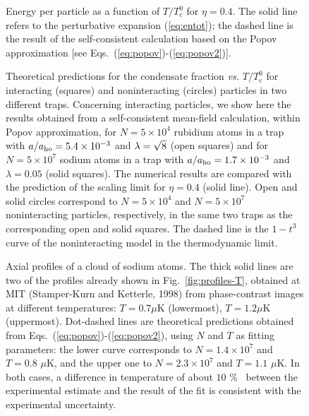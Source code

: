 \bigskip

\begin{figure}[t]
\epsfysize=8cm
\hspace{3cm}
\caption{ Energy per particle as a function of $T/T_c^0$ for $\eta=0.4$. 
The solid line refers to the perturbative expansion (\protect\ref{eq:entot}); 
the dashed line is the result of the self-consistent calculation based on 
the Popov approximation 
[see Eqs.~(\protect\ref{eq:popov})-(\protect\ref{eq:popov2})].} 
\label{fig:s-energy}
\end{figure}

\bigskip

\begin{figure}[t]
\epsfysize=7cm
\hspace{3cm}
\caption{Theoretical predictions for the condensate fraction {\it vs.} 
$T/T_c^0$ for interacting (squares) and noninteracting (circles) 
particles in two different traps. Concerning interacting particles, we
show here the results obtained from a self-consistent mean-field 
calculation, within Popov approximation, for $N=5\times 10^4$ rubidium 
atoms in a trap with $a/a_{\rm ho}= 5.4\times 10^{-3}$ and $\lambda=
\protect \sqrt{8}$ (open squares) and for $N=5\times 10^7$ sodium atoms 
in a trap with $a/a_{\rm ho}=1.7\times 10^{-3}$ and $\lambda=0.05$ (solid
squares). The numerical results are compared with the prediction 
of the scaling limit for $\eta=0.4$ (solid line). Open and solid 
circles correspond to $N=5\times 10^4$ and $N=5\times 10^7$ 
noninteracting particles, respectively, in the same two traps as
the corresponding open and solid squares.  The dashed 
line is the $1-t^3$ curve of the noninteracting model in the 
thermodynamic limit.  }
\label{fig:condfracscaling}
\end{figure}

\bigskip

\begin{figure}[t]
\epsfysize=9cm
\hspace{3cm}
\caption{ Axial profiles of a cloud of sodium atoms. The thick solid 
lines are two of the profiles already shown in 
Fig.~\protect\ref{fig:profiles-T}, obtained at MIT (Stamper-Kurn and 
Ketterle, 1998) from phase-contrast images at different temperatures: 
$T=0.7 \mu$K (lowermost), $T=1.2 \mu$K (uppermost). Dot-dashed lines 
are theoretical predictions obtained from 
Eqs.~(\protect\ref{eq:popov})-(\protect\ref{eq:popov2}), using 
$N$ and $T$ as fitting parameters: the lower curve corresponds to 
$N=1.4 \times 10^7$ and $T=0.8$ $\mu$K, and the upper one to  
$N=2.3 \times 10^7$ and $T=1.1$ $\mu$K. In both cases,  a difference 
in temperature of about $10$ \% \ between the experimental estimate 
and the result of the fit is consistent with the experimental 
uncertainty.  } 
\label{fig:profiles-T-theo}
\end{figure}

